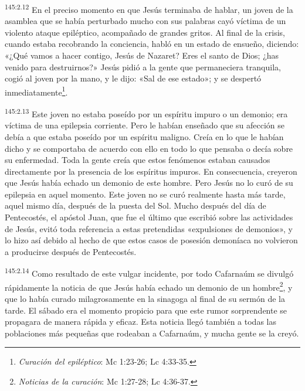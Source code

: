 \par 
\textsuperscript{145:2.12} En el preciso momento en que Jesús terminaba de hablar, un joven de la asamblea que se había perturbado mucho con sus palabras cayó víctima de un violento ataque epiléptico, acompañado de grandes gritos. Al final de la crisis, cuando estaba recobrando la conciencia, habló en un estado de ensueño, diciendo: «¿Qué vamos a hacer contigo, Jesús de Nazaret? Eres el santo de Dios; ¿has venido para destruirnos?» Jesús pidió a la gente que permaneciera tranquila, cogió al joven por la mano, y le dijo: «Sal de ese estado»; y se despertó inmediatamente\footnote{\textit{Curación del epiléptico}: Mc 1:23-26; Lc 4:33-35.}.

\par 
\textsuperscript{145:2.13} Este joven no estaba poseído por un espíritu impuro o un demonio; era víctima de una epilepsia corriente. Pero le habían enseñado que su afección se debía a que estaba poseído por un espíritu maligno. Creía en lo que le habían dicho y se comportaba de acuerdo con ello en todo lo que pensaba o decía sobre su enfermedad. Toda la gente creía que estos fenómenos estaban causados directamente por la presencia de los espíritus impuros. En consecuencia, creyeron que Jesús había echado un demonio de este hombre. Pero Jesús no lo curó de su epilepsia en aquel momento. Este joven no se curó realmente hasta más tarde, aquel mismo día, después de la puesta del Sol. Mucho después del día de Pentecostés, el apóstol Juan, que fue el último que escribió sobre las actividades de Jesús, evitó toda referencia a estas pretendidas «expulsiones de demonios», y lo hizo así debido al hecho de que estos casos de posesión demoníaca no volvieron a producirse después de Pentecostés.

\par 
\textsuperscript{145:2.14} Como resultado de este vulgar incidente, por todo Cafarnaúm se divulgó rápidamente la noticia de que Jesús había echado un demonio de un hombre\footnote{\textit{Noticias de la curación}: Mc 1:27-28; Lc 4:36-37.}, y que lo había curado milagrosamente en la sinagoga al final de su sermón de la tarde. El sábado era el momento propicio para que este rumor sorprendente se propagara de manera rápida y eficaz. Esta noticia llegó también a todas las poblaciones más pequeñas que rodeaban a Cafarnaúm, y mucha gente se la creyó.

